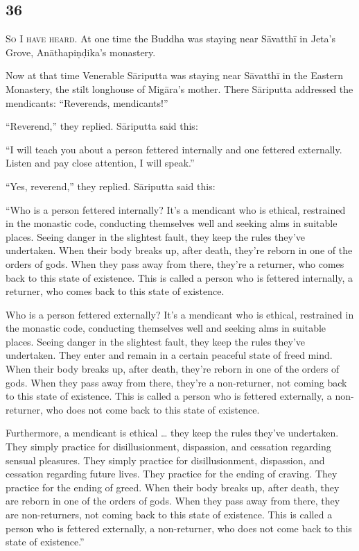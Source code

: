 \documentclass[12pt,openany]{book}%
\newcommand*{\scevam}[1]{\textsc{#1}}
\begin{document}
\subsection*{36 }

\scevam{So I have heard. }At one time the Buddha was staying near \textsanskrit{Sāvatthī} in Jeta’s Grove, \textsanskrit{Anāthapiṇḍika}’s monastery. 

Now at that time Venerable \textsanskrit{Sāriputta} was staying near \textsanskrit{Sāvatthī} in the Eastern Monastery, the stilt longhouse of \textsanskrit{Migāra}’s mother. There \textsanskrit{Sāriputta} addressed the mendicants: “Reverends, mendicants!” 

“Reverend,” they replied. \textsanskrit{Sāriputta} said this: 

“I will teach you about a person fettered internally and one fettered externally. Listen and pay close attention, I will speak.” 

“Yes, reverend,” they replied. \textsanskrit{Sāriputta} said this: 

“Who is a person fettered internally? It’s a mendicant who is ethical, restrained in the monastic code, conducting themselves well and seeking alms in suitable places. Seeing danger in the slightest fault, they keep the rules they’ve undertaken. When their body breaks up, after death, they’re reborn in one of the orders of gods. When they pass away from there, they’re a returner, who comes back to this state of existence. This is called a person who is fettered internally, a returner, who comes back to this state of existence. 

Who is a person fettered externally? It’s a mendicant who is ethical, restrained in the monastic code, conducting themselves well and seeking alms in suitable places. Seeing danger in the slightest fault, they keep the rules they’ve undertaken. They enter and remain in a certain peaceful state of freed mind. When their body breaks up, after death, they’re reborn in one of the orders of gods. When they pass away from there, they’re a non-returner, not coming back to this state of existence. This is called a person who is fettered externally, a non-returner, who does not come back to this state of existence. 

Furthermore, a mendicant is ethical … they keep the rules they’ve undertaken. They simply practice for disillusionment, dispassion, and cessation regarding sensual pleasures. They simply practice for disillusionment, dispassion, and cessation regarding future lives. They practice for the ending of craving. They practice for the ending of greed. When their body breaks up, after death, they are reborn in one of the orders of gods. When they pass away from there, they are non-returners, not coming back to this state of existence. This is called a person who is fettered externally, a non-returner, who does not come back to this state of existence.” 
\end{document}
